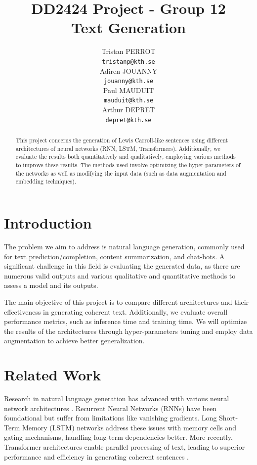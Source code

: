 \documentclass{article}
\title{DD2424 Project - Group 12 \\ Text Generation}
\author{%
  Tristan PERROT \\
  \texttt{tristanp@kth.se} \\
  \And
  Adiren JOUANNY \\
  \texttt{jouanny@kth.se} \\
  \And
  Paul MAUDUIT \\
  \texttt{mauduit@kth.se} \\
  \And
  Arthur DEPRET \\
  \texttt{depret@kth.se} \\
}
\begin{document}
\maketitle


\begin{abstract}
  This project concerns the generation of Lewis Carroll-like sentences using different architectures of neural networks (RNN, LSTM, Transformers). Additionally, we evaluate the results both quantitatively and qualitatively, employing various methods to improve these results. The methods used involve optimizing the hyper-parameters of the networks as well as modifying the input data (such as data augmentation and embedding techniques).
\end{abstract}

\section{Introduction}

The problem we aim to address is natural language generation, commonly used for text prediction/completion, content summarization, and chat-bots. A significant challenge in this field is evaluating the generated data, as there are numerous valid outputs and various qualitative and quantitative methods to assess a model and its outputs.

The main objective of this project is to compare different architectures and their effectiveness in generating coherent text. Additionally, we evaluate overall performance metrics, such as inference time and training time. We will optimize the results of the architectures through hyper-parameters tuning and employ data augmentation to achieve better generalization.

\section{Related Work}
Research in natural language generation has advanced with various neural network architectures \cite{nlpprogress}. Recurrent Neural Networks (RNNs) have been foundational but suffer from limitations like vanishing gradients. Long Short-Term Memory (LSTM) networks address these issues with memory cells and gating mechanisms, handling long-term dependencies better. More recently, Transformer architectures enable parallel processing of text, leading to superior performance and efficiency in generating coherent sentences \cite{grulstm}.
\end{document}
